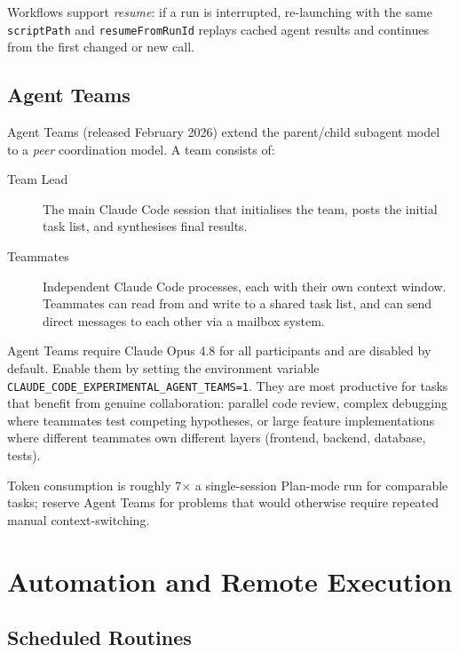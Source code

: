 Workflows support \emph{resume}: if a run is interrupted, re-launching with
the same \texttt{scriptPath} and \texttt{resumeFromRunId} replays cached
agent results and continues from the first changed or new call.

\subsection{Agent Teams}
\label{app:claude-code:agent-teams}

Agent Teams (released February 2026) extend the parent/child subagent model
to a \emph{peer} coordination model.  A team consists of:

\begin{description}
  \item[Team Lead] The main Claude Code session that initialises the team,
        posts the initial task list, and synthesises final results.
  \item[Teammates] Independent Claude Code processes, each with their own
        context window.  Teammates can read from and write to a shared task
        list, and can send direct messages to each other via a mailbox system.
\end{description}

Agent Teams require Claude Opus 4.8 for all participants and are disabled by
default.  Enable them by setting the environment variable
\texttt{CLAUDE\_CODE\_EXPERIMENTAL\_AGENT\_TEAMS=1}.  They are most productive
for tasks that benefit from genuine collaboration: parallel code review, complex
debugging where teammates test competing hypotheses, or large feature
implementations where different teammates own different layers (frontend,
backend, database, tests).

Token consumption is roughly 7$\times$ a single-session Plan-mode run for
comparable tasks; reserve Agent Teams for problems that would otherwise require
repeated manual context-switching.

\section{Automation and Remote Execution}
\label{app:claude-code:automation}

\subsection{Scheduled Routines}
\label{app:claude-code:routines}

